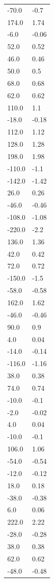\begin{longtable}{ll}
-70.0 & -0.7 \\
174.0 & 1.74 \\
-6.0 & -0.06 \\
52.0 & 0.52 \\
46.0 & 0.46 \\
50.0 & 0.5 \\
68.0 & 0.68 \\
62.0 & 0.62 \\
110.0 & 1.1 \\
-18.0 & -0.18 \\
112.0 & 1.12 \\
128.0 & 1.28 \\
198.0 & 1.98 \\
-110.0 & -1.1 \\
-142.0 & -1.42 \\
26.0 & 0.26 \\
-46.0 & -0.46 \\
-108.0 & -1.08 \\
-220.0 & -2.2 \\
136.0 & 1.36 \\
42.0 & 0.42 \\
72.0 & 0.72 \\
-150.0 & -1.5 \\
-58.0 & -0.58 \\
162.0 & 1.62 \\
-46.0 & -0.46 \\
90.0 & 0.9 \\
4.0 & 0.04 \\
-14.0 & -0.14 \\
-116.0 & -1.16 \\
38.0 & 0.38 \\
74.0 & 0.74 \\
-10.0 & -0.1 \\
-2.0 & -0.02 \\
4.0 & 0.04 \\
-10.0 & -0.1 \\
106.0 & 1.06 \\
-54.0 & -0.54 \\
-12.0 & -0.12 \\
18.0 & 0.18 \\
-38.0 & -0.38 \\
6.0 & 0.06 \\
222.0 & 2.22 \\
-28.0 & -0.28 \\
38.0 & 0.38 \\
62.0 & 0.62 \\
-48.0 & -0.48 \\

\end{longtable}
